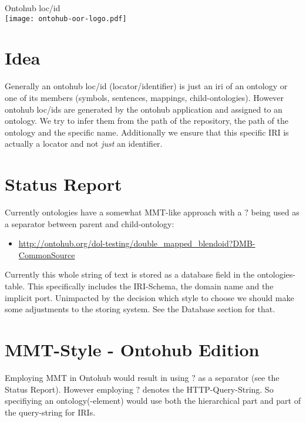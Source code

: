 \documentclass[a4paper,11pt,DIV=25]{scrartcl}
\author{Tim Reddehase}
\date{2014-09-09}
\begin{document}
\Huge
\begin{center}
  Ontohub loc/id\\
  \bigskip
  \texttt{[image: ontohub-oor-logo.pdf]}
\end{center}
\normalsize

\bigskip

\section{Idea}

Generally an ontohub loc/id (locator/identifier) is just an iri of an ontology
or one of its members (symbols, sentences, mappings, child-ontologies). However
ontohub loc/ids are generated by the ontohub application and assigned to an
ontology.  We try to infer them from the path of the repository, the path of
the ontology and the specific name. Additionally we ensure that this specific
IRI is actually a locator and not \textit{just} an identifier.

\section{Status Report}

Currently ontologies have a somewhat MMT-like approach with a $?$ being used as
a separator between parent and child-ontology:

\begin{itemize}
  \item \url{http://ontohub.org/dol-testing/double_mapped_blendoid?DMB-CommonSource}
\end{itemize}

Currently this whole string of text is stored as a database field in the
ontologies-table.  This specifically includes the IRI-Schema, the domain name
and the implicit port. Unimpacted by the decision which style to choose we
should make some adjustments to the storing system. See the Database section
for that.

\pagebreak

\section{MMT-Style - Ontohub Edition}

Employing MMT in Ontohub would result in using $?$ as a separator (see the
Status Report).  However employing $?$ denotes the HTTP-Query-String. So
specifiying an ontology(-element) would use both the hierarchical part and part
of the query-string for IRIs.
\end{document}
